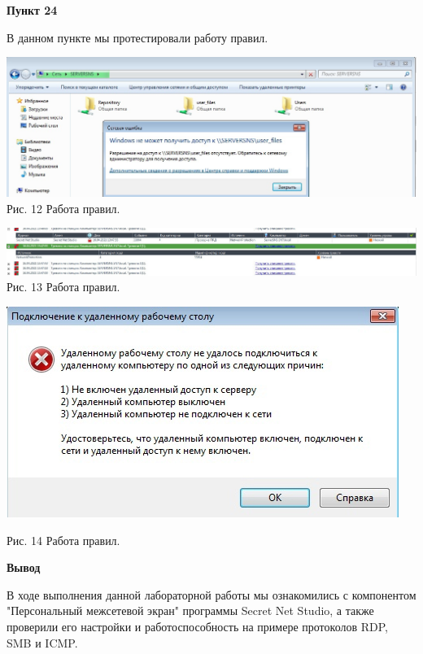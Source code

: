 \documentclass[a4paper,14pt]{extarticle}
\begin{document}
    \newpage
    \textbf{Пункт 24}
    \vspace{-3ex}
    \begin{center}
        \singlespacing
        В данном пункте мы протестировали работу правил.

        \includegraphics[scale=0.35]{pics/24_1.jpg}\\

        Рис. 12 Работа правил.

        \includegraphics[scale=0.25]{pics/24_2.jpg}\\

        Рис. 13 Работа правил.

        \includegraphics[scale=0.6]{pics/24_3.jpg}

        Рис. 14 Работа правил.
    \end{center}

    \textbf{Вывод}\par
    В ходе выполнения данной лабораторной работы мы ознакомились с компонентом "Персональный межсетевой экран" программы Secret Net Studio, 
а также проверили его настройки и работоспособность на примере протоколов RDP, SMB и ICMP. 
\end{document}
